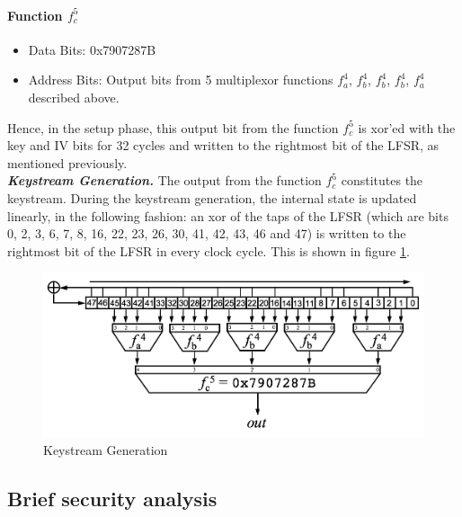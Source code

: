 \paragraph{Function $f_c^5$}
\begin{itemize}
\item Data Bits: 0x7907287B
\item Address Bits: Output bits from 5 multiplexor functions $f_a^4$, $f_b^4$, $f_b^4$, $f_b^4$, $f_a^4$ described above. 
\end{itemize}

Hence, in the setup phase, this output bit from the function $f_c^5$ is xor'ed with the key and IV bits for 32 cycles and written to the rightmost bit of the LFSR, as mentioned previously. \\

\textit{\textbf{Keystream Generation.}} The output from the function $f_c^5$ constitutes the keystream. During the keystream generation, the internal state is updated linearly, in the following fashion: an xor of the taps of the LFSR (which are bits 0, 2, 3, 6, 7, 8, 16, 22, 23, 26, 30, 41, 42, 43, 46 and 47) is written to the rightmost bit of the LFSR in every clock cycle. This is shown in figure \ref{fig:hitag2-3}.

\begin{figure}[h!]
	\centering
		\includegraphics[width=5in]{./figures/hitag2-3.PNG}
	\caption{Keystream Generation}	
	\label{fig:hitag2-3}
\end{figure}

\subsection{Brief security analysis}
